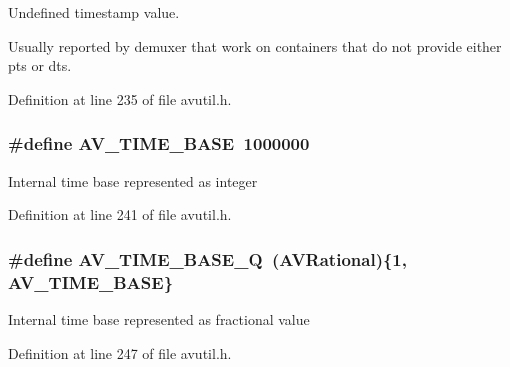 Undefined timestamp value. 

Usually reported by demuxer that work on containers that do not provide either pts or dts. 

Definition at line 235 of file avutil.\+h.

\subsubsection[{\texorpdfstring{A\+V\+\_\+\+T\+I\+M\+E\+\_\+\+B\+A\+SE}{AV_TIME_BASE}}]{\setlength{\rightskip}{0pt plus 5cm}\#define A\+V\+\_\+\+T\+I\+M\+E\+\_\+\+B\+A\+SE~1000000}\hypertarget{group__lavu__time_gaa11ed202b70e1f52bac809811a910e2a}{}\label{group__lavu__time_gaa11ed202b70e1f52bac809811a910e2a}
Internal time base represented as integer 

Definition at line 241 of file avutil.\+h.

\subsubsection[{\texorpdfstring{A\+V\+\_\+\+T\+I\+M\+E\+\_\+\+B\+A\+S\+E\+\_\+Q}{AV_TIME_BASE_Q}}]{\setlength{\rightskip}{0pt plus 5cm}\#define A\+V\+\_\+\+T\+I\+M\+E\+\_\+\+B\+A\+S\+E\+\_\+Q~({\bf A\+V\+Rational})\{1, {\bf A\+V\+\_\+\+T\+I\+M\+E\+\_\+\+B\+A\+SE}\}}\hypertarget{group__lavu__time_gafd07a13a4ddaa6015275cad6022d9ee3}{}\label{group__lavu__time_gafd07a13a4ddaa6015275cad6022d9ee3}
Internal time base represented as fractional value 

Definition at line 247 of file avutil.\+h.

